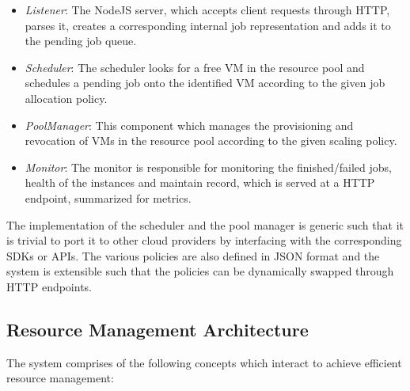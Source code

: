\documentclass[a4paper]{IEEEtran}
\begin{document}
 \begin{itemize}
   \item \emph{Listener}: The NodeJS server, which accepts client requests through HTTP, parses it, creates a 
   corresponding internal job representation and adds it to the pending job queue.
   \item \emph{Scheduler}: The scheduler looks for a free VM in the resource pool and schedules a pending job
   onto the identified VM according to the given job allocation policy.
   \item \emph{PoolManager}: This component which manages the provisioning and revocation of VMs in the resource 
   pool according to the given scaling policy.
   \item \emph{Monitor}: The monitor is responsible for monitoring the finished/failed jobs, health of the instances
    and maintain record, which is served at a HTTP endpoint, summarized for metrics.
 \end{itemize}

The implementation of the scheduler and the pool manager is generic such that it is trivial to port it to other 
cloud providers by interfacing with the corresponding SDKs or APIs. The various policies are also defined in JSON
format and the system is extensible such that the policies can be dynamically swapped through HTTP endpoints.

\subsection{Resource Management Architecture}

The system comprises of the following concepts which interact to achieve efficient resource management:
\end{document}

